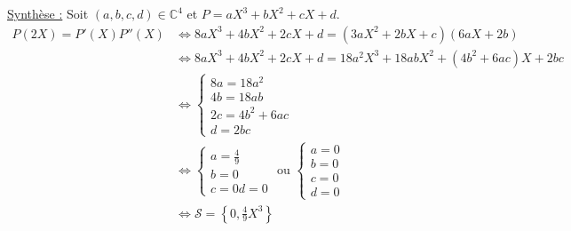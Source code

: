 \documentclass[titlepage, twoside]{report}
\begin{document}
\begin{enumerate}
    \noindent \underline{Synthèse :}
    Soit $(a,b,c,d) \in \mathbb{C}^4$ et $P = aX^3 + bX^2 + cX + d$. 
    \begin{align*}
        P(2X) = P'(X) P''(X) &\Leftrightarrow 8aX^3 + 4bX^2 + 2cX + d = (3aX^2 + 2bX + c)(6aX + 2b) \\
        &\Leftrightarrow 8aX^3 + 4bX^2 + 2cX + d = 18a^2 X^3 + 18abX^2 + (4b^2 + 6ac)X + 2bc \\
        &\Leftrightarrow \begin{cases}
            8a = 18a^2 \\
            4b = 18ab \\
            2c = 4b^2 + 6ac \\
            d = 2bc
        \end{cases} \\
        &\Leftrightarrow \begin{cases}
            a = \frac{4}{9} \\
            b = 0 \\
            c = 0
            d = 0
        \end{cases}
        \text{ ou }
        \begin{cases}
            a = 0 \\
            b = 0 \\
            c = 0 \\
            d = 0
        \end{cases} \\
        &\Leftrightarrow \mathcal{S} = \left\{ 0, \frac{4}{9}X^3 \right\}
    \end{align*}
\end{enumerate}
\end{document}
